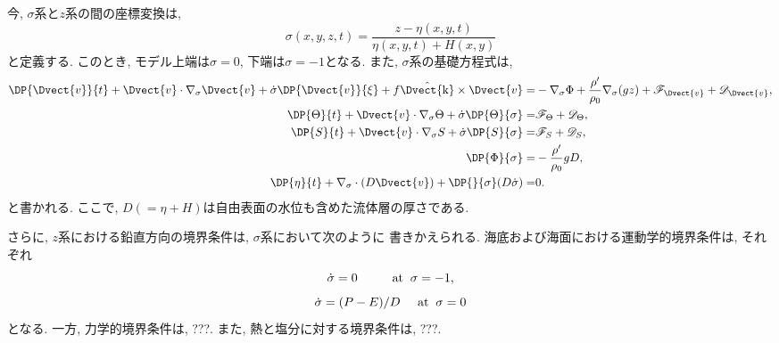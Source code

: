 \documentclass[a4j,12pt,openbib,oneside]{jreport}
\def\univec#1{ \hat{ \Dvect{\rm #1}} }
\begin{document}
今, $\sigma$系と$z$系の間の座標変換は, 
\begin{equation}
 \sigma(x,y,z,t) =　\dfrac{z - \eta(x,y,t)}{\eta(x,y,t) + H(x,y)} 
\end{equation}
と定義する. 
このとき, モデル上端は$\sigma=0$, 下端は$\sigma=-1$となる. 
また, $\sigma$系の基礎方程式は, 
\begin{align}
  \DP{\Dvect{v}}{t} + \Dvect{v} \cdot \nabla_\sigma \Dvect{v} + \dot{\sigma} \DP{\Dvect{v}}{\xi} + f \univec{k} \times \Dvect{v} 
 =& - \nabla_\sigma \Phi + \dfrac{\rho'}{\rho_0} \nabla_\sigma (gz) 
  + \mathscr{F}_{\Dvect{v}} + \mathscr{D}_{\Dvect{v}}, \label{hmotion_Eq_SigCoord} \\
   \DP{\Theta}{t} + \Dvect{v}\cdot\nabla_\sigma\Theta + \dot{\sigma} \DP{\Theta}{\sigma} 
 =& \mathscr{F}_\Theta + \mathscr{D}_\Theta, \label{ptemp_Eq_SigCoord} \\
   \DP{S}{t} + \Dvect{v}\cdot\nabla_\sigma S + \dot{\sigma}\DP{S}{\sigma} 
 =& \mathscr{F}_S + \mathscr{D}_S, \label{salt_Eq_SigCoord} \\
  \DP{\Phi}{\sigma} =& - \dfrac{\rho'}{\rho_0} gD, \label{hydrostatic_Eq_SigCoord} \\
  \DP{\eta}{t} + \nabla_\sigma \cdot (D \Dvect{v}) + \DP{}{\sigma}(D \dot{\sigma}) =& 0 \label{continious_Eq_SigCoord}. 
\end{align}
と書かれる. 
ここで, $D(=\eta+H)$は自由表面の水位も含めた流体層の厚さである. 

さらに, $z$系における鉛直方向の境界条件は, $\sigma$系において次のように
書きかえられる. 
海底および海面における運動学的境界条件は, 
それぞれ
\begin{equation}
 \dot{\sigma} = 0 \;\;\;\;\;\;\;\;\;\; {\rm at} \;\; \sigma=-1,
\end{equation}
\begin{equation}
 \dot{\sigma} = (P-E)/D \;\;\;\;\;     {\rm at} \;\; \sigma=0
\end{equation}
となる. 
一方, 力学的境界条件は, ???.
また, 熱と塩分に対する境界条件は, ???.

%
\end{document}
